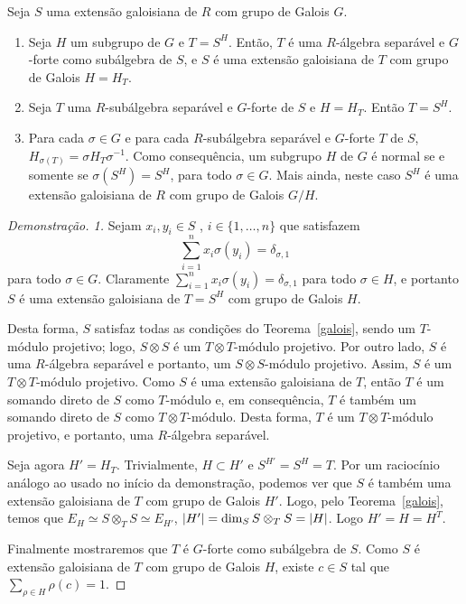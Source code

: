 \begin{teo}\label{teo:corresp-comut}
Seja $S$ uma extensão galoisiana de $R$ com grupo de Galois $G$.
\begin{enumerate}
    \item Seja $H$ um subgrupo de $G$ e $T=S^H$. Então, $T$ é uma $R$-álgebra separável e $G$-forte como subálgebra de $S$, e $S$ é uma extensão galoisiana de $T$ com grupo de Galois $H=H_T$.
    \item Seja $T$ uma $R$-subálgebra separável e $G$-forte de $S$ e $H=H_T$. Então $T=S^H$.
    \item Para cada $\sigma \in G$ e para cada $R$-subálgebra separável e $G$-forte $T$ de $S$, $H_{\sigma(T)}=\sigma H_T\sigma^{-1}$. Como consequência, um subgrupo $H$ de $G$ é normal se e somente se $\sigma(S^H) =S^H$, para todo $\sigma \in G$. Mais ainda, neste caso $S^H$ é uma extensão galoisiana de $R$ com grupo de Galois $G/H$.
\end{enumerate}
\begin{proof}[Demonstração. 1]\let\qed\relax
Sejam $x_i,y_i \in S$ , $i\in \{1,\dots,n\}$ que satisfazem\[\sum_{i=1}^{n} x_i\sigma(y_i)=\delta_{\sigma, 1}\]para todo $\sigma\in G$. Claramente $\sum_{i=1}^{n}x_i\sigma(y_i)=\delta_{\sigma, 1}$ para todo $\sigma \in H$, e portanto $S$ é uma extensão galoisiana de $T=S^H$ com grupo de Galois $H$. \par Desta forma, $S$ satisfaz todas as condições do Teorema~\ref{galois}, sendo um $T$-módulo projetivo; logo, $S\otimes S$ é um $T\otimes T$-módulo projetivo. Por outro lado, $S$ é uma $R$-álgebra separável e portanto, um $S\otimes S$-módulo projetivo. Assim, $S$ é um $T\otimes T$-módulo projetivo. Como $S$ é uma extensão galoisiana de $T$, então $T$ é um somando direto de $S$ como $T$-módulo e, em consequência, $T$ é também um somando direto de $S$ como $T\otimes T$-módulo. Desta forma, $T$ é um $T\otimes T$-módulo projetivo, e portanto, uma $R$-álgebra separável.

Seja agora $H'=H_T$. Trivialmente, $H\subset H'$ e $S^{H'}=S^H=T$. Por um raciocínio análogo ao usado no início da demonstração, podemos ver que $S$ é também uma extensão galoisiana de $T$ com grupo de Galois $H'$. Logo, pelo Teorema~\ref{galois}, temos que $E_H \simeq S\otimes_T S \simeq E_{H'}$, $\left| H' \right|=\dim_SS\otimes_T S=\left| H \right|$. Logo $H'=H=H^T$.

Finalmente mostraremos que $T$ é $G$-forte como subálgebra de $S$. Como $S$ é extensão galoisiana de $T$ com grupo de Galois $H$, existe $c\in S$ tal que $\sum_{\rho \in H}\rho(c) =1$.


\end{proof}
\end{teo}
